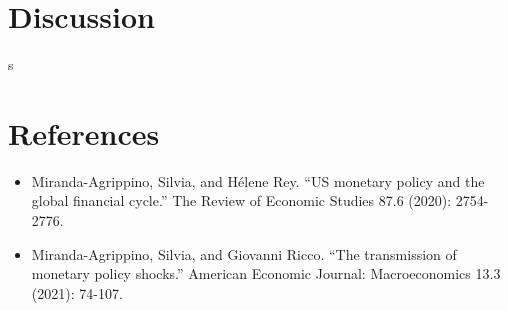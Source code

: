 \documentclass[11pt,a4paper,draft]{article}
\begin{document}
\section{Discussion}


s


















\section{References}
\begin{itemize}
    \item Miranda-Agrippino, Silvia, and Hélene Rey. \enquote{US monetary policy and the global financial cycle.} The Review of Economic Studies 87.6 (2020): 2754-2776.
    \item Miranda-Agrippino, Silvia, and Giovanni Ricco. \enquote{The transmission of monetary policy shocks.} American Economic Journal: Macroeconomics 13.3 (2021): 74-107.
\end{itemize}
\end{document}
